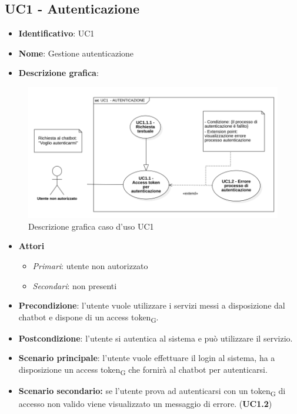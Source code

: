 \subsection{UC1 - Autenticazione}
\begin{itemize}
    \item \textbf{Identificativo}: UC1
    \item \textbf{Nome}: Gestione autenticazione
    \item \textbf{Descrizione grafica}:
\end{itemize}

\begin{figure}[h]
    \centering
    \includegraphics[scale=0.50]{images/UC1.png} 
    \caption{Descrizione grafica caso d'uso UC1}
\end{figure}

 \begin{itemize}
    \item \textbf{Attori}
 \begin{itemize} 
    \item \textit{Primari}: utente non autorizzato
    \item \textit{Secondari}: non presenti
 \end{itemize}
 \item \textbf{Precondizione}: l'utente vuole utilizzare i servizi messi a disposizione dal chatbot e dispone di un access token\textsubscript{G}.
 \item \textbf{Postcondizione}: l'utente si autentica al sistema e può utilizzare il servizio.
 \item \textbf{Scenario principale}: l'utente vuole effettuare il login al sistema, ha a disposizione un access token\textsubscript{G} che fornirà al chatbot per autenticarsi.
 \item \textbf{Scenario secondario:} se l'utente prova ad autenticarsi con un token\textsubscript{G} di accesso non valido viene visualizzato un messaggio di errore. (\textbf{UC1.2})
\end{itemize}
\newpage


